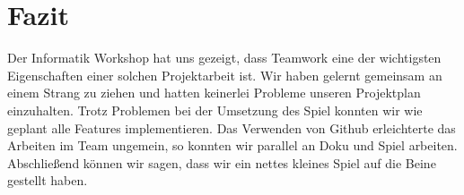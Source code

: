 \chapter{Fazit}
Der Informatik Workshop hat uns gezeigt, dass Teamwork eine der wichtigsten Eigenschaften einer solchen Projektarbeit ist. Wir haben gelernt gemeinsam an einem Strang zu ziehen und hatten keinerlei Probleme unseren Projektplan einzuhalten. Trotz Problemen bei der Umsetzung des Spiel konnten wir wie geplant alle Features implementieren. Das Verwenden von Github erleichterte das Arbeiten im Team ungemein, so konnten wir parallel an Doku und Spiel arbeiten. Abschließend können wir sagen, dass wir ein nettes kleines Spiel auf die Beine gestellt haben.